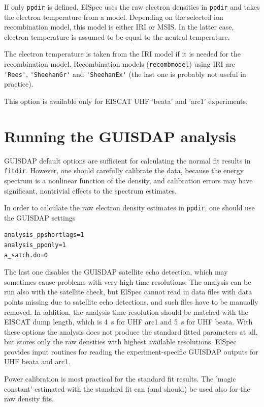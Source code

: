 \documentclass[12pt,a4paper]{report}
\begin{document}
If only \verb|ppdir| is defined, ElSpec uses the raw electron densities in \verb|ppdir| and takes the electron temperature from a model. Depending on the selected ion recombination model, this model is either IRI or MSIS. In the latter case, electron temperature is assumed to be equal to the neutral temperature. 

The electron temperature is taken from the IRI model if it is needed for the recombination model. Recombination models (\verb|recombmodel|) using IRI are \verb|'Rees'|, \verb|'SheehanGr'| and \verb|'SheehanEx'| (the last one is probably not useful in practice).

This option is available only for EISCAT UHF 'beata' and 'arc1' experiments. 


\section{Running the GUISDAP analysis}\label{secGUISDAP}

GUISDAP default options are sufficient for calculating the normal fit results in \verb|fitdir|. However, one should carefully calibrate the data, because the energy spectrum is a nonlinear function of the density, and calibration errors may have significant, nontrivial effects to the spectrum estimates. 

In order to calculate the raw electron density estimates in \verb|ppdir|, one should use the GUISDAP settings
\begin{verbatim}
analysis_ppshortlags=1
analysis_pponly=1
a_satch.do=0 
\end{verbatim}
The last one disables the GUISDAP satellite echo detection, which may sometimes cause problems with very high time resolutions. The analysis can be run also with the satellite check, but ElSpec cannot read in data files with data points missing due to satellite echo detections, and such files have to be manually removed. In addition, the analysis time-resolution should be matched with the EISCAT dump length, which is 4~s for UHF arc1 and 5~s for UHF beata. With these options the analysis does not produce the standard fitted parameters at all, but stores only the raw densities with highest available resolutions. ElSpec provides input routines for reading the experiment-specific GUISDAP outputs for UHF beata and arc1. 

Power calibration is most practical for the standard fit results. The 'magic constant' estimated with the standard fit can (and should) be used also for the raw density fits. 
\end{document}
